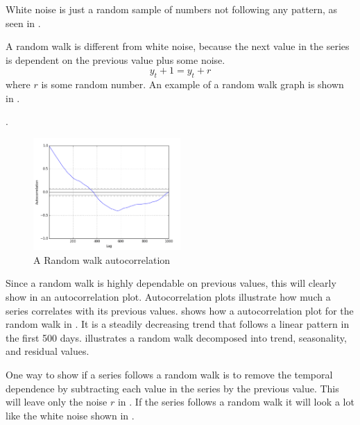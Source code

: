 White noise is just a random sample of numbers not following any pattern, as seen in
.

A random walk is different from white noise, because the next value in the series is dependent on the previous value plus some noise.
\begin{equation}
  y_t+1 = y_t + r
  \label{eq:random_walk}
\end{equation}
where $r$ is some random number.
An example of a random walk graph is shown in .

.
\begin{figure}[H]
  \centering
  \includegraphics[width=0.5\textwidth]{./figs/illustrations/random_walk_autocorrelation.png}
  \hfill
  \caption{A Random walk autocorrelation}
  \label{fig:dataset:random_walk_autocorrelation}
\end{figure}

Since a random walk is highly dependable on previous values, this will clearly show in an autocorrelation plot.
Autocorrelation plots illustrate how much a series correlates with its previous values.
 shows how a autocorrelation plot for the random walk in .
It is a steadily decreasing trend that follows a linear pattern in the first 500 days.
 illustrates a random walk decomposed into trend, seasonality, and residual values.

One way to show if a series follows a random walk is to remove the temporal dependence by subtracting each value in the series by the previous value.
This will leave only the noise $r$ in .
If the series follows a random walk it will look a lot like the white noise shown in .

